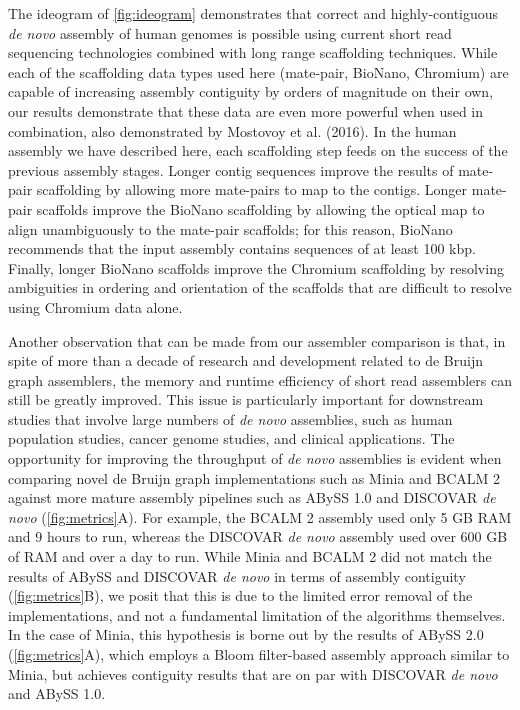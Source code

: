 \documentclass[
  12pt,
  oneside,
  openany]{book}
\begin{document}
The ideogram of \cref{fig:ideogram} demonstrates that correct and highly-contiguous \emph{de novo} assembly of human genomes is possible using current short read sequencing technologies combined with long range scaffolding techniques. While each of the scaffolding data types used here (mate-pair, BioNano, Chromium) are capable of increasing assembly contiguity by orders of magnitude on their own, our results demonstrate that these data are even more powerful when used in combination, also demonstrated by Mostovoy et al. (2016). In the human assembly we have described here, each scaffolding step feeds on the success of the previous assembly stages. Longer contig sequences improve the results of mate-pair scaffolding by allowing more mate-pairs to map to the contigs. Longer mate-pair scaffolds improve the BioNano scaffolding by allowing the optical map to align unambiguously to the mate-pair scaffolds; for this reason, BioNano recommends that the input assembly contains sequences of at least 100 kbp. Finally, longer BioNano scaffolds improve the Chromium scaffolding by resolving ambiguities in ordering and orientation of the scaffolds that are difficult to resolve using Chromium data alone.

Another observation that can be made from our assembler comparison is that, in spite of more than a decade of research and development related to de Bruijn graph assemblers, the memory and runtime efficiency of short read assemblers can still be greatly improved. This issue is particularly important for downstream studies that involve large numbers of \emph{de novo} assemblies, such as human population studies, cancer genome studies, and clinical applications. The opportunity for improving the throughput of \emph{de novo} assemblies is evident when comparing novel de Bruijn graph implementations such as Minia and BCALM 2 against more mature assembly pipelines such as ABySS 1.0 and DISCOVAR \emph{de novo} (\cref{fig:metrics}A). For example, the BCALM 2 assembly used only 5 GB RAM and 9 hours to run, whereas the DISCOVAR \emph{de novo} assembly used over 600 GB of RAM and over a day to run. While Minia and BCALM 2 did not match the results of ABySS and DISCOVAR \emph{de novo} in terms of assembly contiguity (\cref{fig:metrics}B), we posit that this is due to the limited error removal of the implementations, and not a fundamental limitation of the algorithms themselves. In the case of Minia, this hypothesis is borne out by the results of ABySS 2.0 (\cref{fig:metrics}A), which employs a Bloom filter-based assembly approach similar to Minia, but achieves contiguity results that are on par with DISCOVAR \emph{de novo} and ABySS 1.0.
\end{document}
